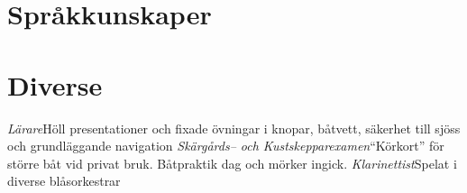 \documentclass[11pt,a4paper,sans]{moderncv}   %
\begin{document}
\section{Språkkunskaper}
\section{Diverse}
{\textit{Lärare}}{Höll presentationer och fixade övningar i knopar, båtvett, säkerhet till sjöss och grundläggande navigation}
{\textit{Skärgårds-- och Kustskepparexamen}}{``Körkort'' för större båt vid privat bruk. Båtpraktik dag och mörker ingick.} 
{\textit{Klarinettist}}{Spelat i diverse blåsorkestrar}
\end{document}
